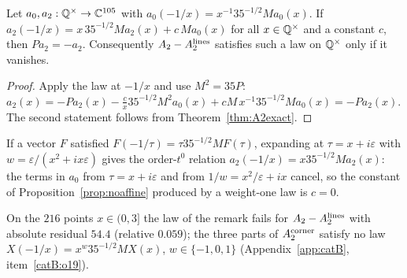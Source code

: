 \begin{proposition}\label{prop:noaffine}
Let $a_0,a_2:\mathbb{Q}^\times\to\mathbb{C}^{105}$ with $a_0(-1/x)=x^{-1}35^{-1/2}Ma_0(x)$. If $a_2(-1/x)=x\,35^{-1/2}Ma_2(x)+c\,Ma_0(x)$ for all $x\in\mathbb{Q}^\times$ and a constant $c$, then
$Pa_2=-a_2$. Consequently $A_2-A_2^{\rm lines}$ satisfies such a law on $\mathbb{Q}^\times$ only if it vanishes.
\end{proposition}
\begin{proof}
Apply the law at $-1/x$ and use $M^2=35P$: $a_2(x)=-Pa_2(x)-\frac cx35^{-1/2}M^2a_0(x)+cM\,x^{-1}35^{-1/2}Ma_0(x)=-Pa_2(x)$. The second statement follows from
Theorem~\ref{thm:A2exact}.
\end{proof}
\begin{remark}
If a vector $F$ satisfied $F(-1/\tau)=\tau35^{-1/2}MF(\tau)$, expanding at $\tau=x+i\varepsilon$ with $w=\varepsilon/(x^2+ix\varepsilon)$ gives the order-$t^0$ relation
$a_2(-1/x)=x35^{-1/2}Ma_2(x)$: the terms in $a_0$ from $\tau=x+i\varepsilon$ and from $1/w=x^2/\varepsilon+ix$ cancel, so the constant of Proposition~\ref{prop:noaffine}
produced by a weight-one law is $c=0$.
\end{remark}
\begin{catbremark}
On the $216$ points $x\in(0,3]$ the law of the remark fails for $A_2-A_2^{\rm lines}$ with absolute residual $54.4$ (relative $0.059$); the three parts of $A_2^{\rm corner}$
satisfy no law $X(-1/x)=x^w35^{-1/2}MX(x)$, $w\in\{-1,0,1\}$ (Appendix~\ref{app:catB}, item~\ref{catB:o19}).
\end{catbremark}

